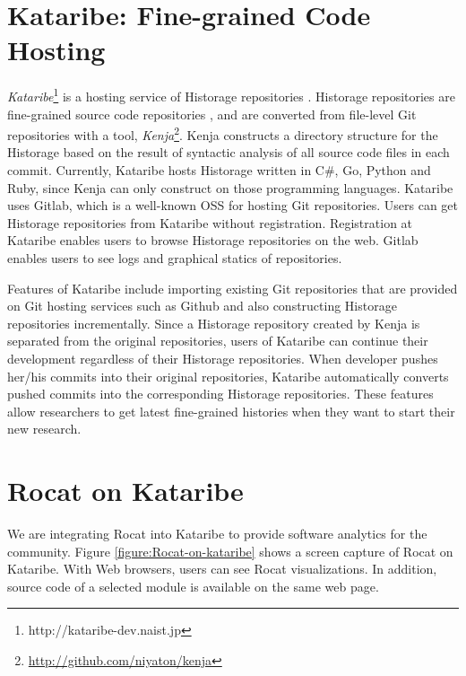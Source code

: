 \documentclass[conference]{IEEEtran}
\newcommand{\figref}[1]{Figure \ref{#1}}
\begin{document}
\section{Kataribe: Fine-grained Code Hosting}
\textit{Kataribe}\footnote{http://kataribe-dev.naist.jp} is a hosting service of Historage repositories \cite{Fujiwara:2014:KHS:2597073.2597125}.
Historage repositories are fine-grained source code repositories \cite{Hata:2011:HFV:2024445.2024463}, and are converted from file-level Git repositories with a tool, \textit{Kenja}\footnote{\url{http://github.com/niyaton/kenja}}.
Kenja constructs a directory structure for the Historage based on the result of syntactic analysis of all source code files in each commit.
Currently, Kataribe hosts Historage written in C\#, Go, Python and Ruby, since Kenja can only construct on those programming languages.
Kataribe uses Gitlab, which is a well-known OSS for hosting Git repositories.
Users can get Historage repositories from Kataribe without registration.
Registration at Kataribe enables users to browse Historage repositories on the web.
Gitlab enables users to see logs and graphical statics of repositories.

Features of Kataribe include importing existing Git repositories that are provided on Git hosting services such as Github and also constructing Historage repositories incrementally.
Since a Historage repository created by Kenja is separated from the original repositories, users of Kataribe can continue their development regardless of their Historage repositories.
When developer pushes her/his commits into their original repositories, Kataribe automatically converts pushed commits into the corresponding Historage repositories.
These features allow researchers to get latest fine-grained histories when they want to start their new research.

\section{Rocat on Kataribe}
We are integrating Rocat into Kataribe to provide software analytics for the community.
\figref{figure:Rocat-on-kataribe} shows a screen capture of Rocat on Kataribe.
With Web browsers, users can see Rocat visualizations. In addition, source code of a selected module is available on the same web page.
\end{document}
